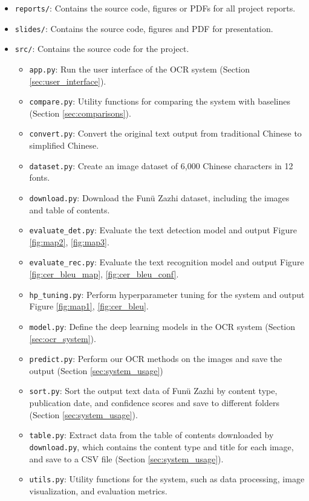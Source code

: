 \documentclass[12pt,twoside]{report}
\begin{document}
\begin{appendices}
{\begin{itemize}[leftmargin=*]
    \item \texttt{reports/}: Contains the source code, figures or PDFs for all project reports.
    \item \texttt{slides/}: Contains the source code, figures and PDF for presentation.
    \item \texttt{src/}: Contains the source code for the project.
    \begin{itemize}
        \item \texttt{app.py}: Run the user interface of the OCR system (Section \ref{sec:user_interface}).
        \item \texttt{compare.py}: Utility functions for comparing the system with baselines (Section \ref{sec:comparisons}).
        \item \texttt{convert.py}: Convert the original text output from traditional Chinese to simplified Chinese.
        \item \texttt{dataset.py}: Create an image dataset of 6,000 Chinese characters in 12 fonts.
        \item \texttt{download.py}: Download the Funü Zazhi dataset, including the images and table of contents.
        \item \texttt{evaluate\_det.py}: Evaluate the text detection model and output Figure \ref{fig:map2}, \ref{fig:map3}.
        \item \texttt{evaluate\_rec.py}: Evaluate the text recognition model and output Figure \ref{fig:cer_bleu_map}, \ref{fig:cer_bleu_conf}.
        \item \texttt{hp\_tuning.py}: Perform hyperparameter tuning for the system and output Figure \ref{fig:map1}, \ref{fig:cer_bleu}.
        \item \texttt{model.py}: Define the deep learning models in the OCR system (Section \ref{sec:ocr_system}).
        \item \texttt{predict.py}: Perform our OCR methods on the images and save the output (Section \ref{sec:system_usage})
        \item \texttt{sort.py}: Sort the output text data of Funü Zazhi by content type, publication date, and confidence scores and save to different folders (Section \ref{sec:system_usage}).
        \item \texttt{table.py}: Extract data from the table of contents downloaded by \texttt{download.py}, which contains the content type and title for each image, and save to a CSV file (Section \ref{sec:system_usage}).
        \item \texttt{utils.py}: Utility functions for the system, such as data processing, image visualization, and evaluation metrics.

\end{itemize}
\end{itemize}}
\end{appendices}
\end{document}
